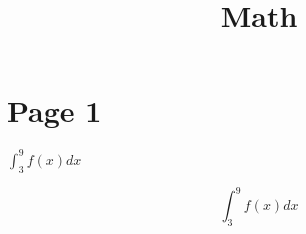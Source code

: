 \documentclass[12pt]{article}
\begin{document}
\title{Math}
\author{}
\date{}
\maketitle

\section*{Page 1}
$\int_{3}^{9} f(x)dx $ 

\begin{equation}
\int_{3}^{9} f(x)dx
\end{equation}
\end{document}
